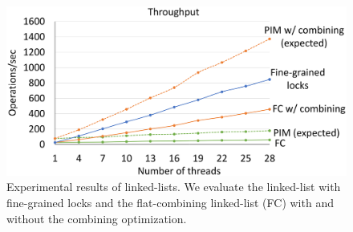 \begin{figure}[ht!]
    \centering
    \includegraphics[width=.95\linewidth]{linkedlist_data.eps} 
    \caption{Experimental results of linked-lists. We evaluate the linked-list with fine-grained locks 
        and the flat-combining linked-list (FC) with and without the combining optimization.}
   \label{figure:linkedlist_data}
\end{figure}


